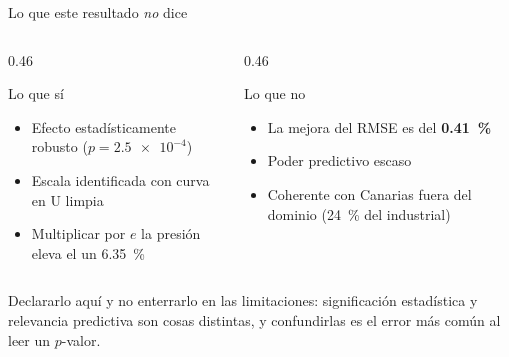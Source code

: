 \documentclass[11pt,aspectratio=169]{beamer}
\begin{document}
\begin{frame}{Lo que este resultado \emph{no} dice}
\vspace{-10mm}
\vspace{4mm}
\begin{columns}[T]
\begin{column}{0.46\textwidth}
\begin{block}{Lo que sí}
\small
\begin{itemize}
  \item Efecto estadísticamente robusto ($p = \num{2.5e-4}$)
  \item Escala identificada con curva en U limpia
  \item Multiplicar por $e$ la presión eleva el  un
        \SI{6.35}{\percent}
\end{itemize}
\end{block}
\end{column}
\begin{column}{0.46\textwidth}
\begin{alertblock}{Lo que no}
\small
\begin{itemize}
  \item La mejora del RMSE es del \textbf{\SI{0.41}{\percent}}
  \item Poder predictivo escaso
  \item Coherente con Canarias fuera del dominio (\SI{24}{\percent} del
         industrial)
\end{itemize}
\end{alertblock}
\end{column}
\end{columns}

\vspace{7mm}
\begin{center}
{\small Declararlo aquí y no enterrarlo en las limitaciones: significación
estadística y relevancia predictiva son cosas distintas, y confundirlas es el
error más común al leer un $p$-valor.}
\end{center}

\end{frame}
\end{document}
